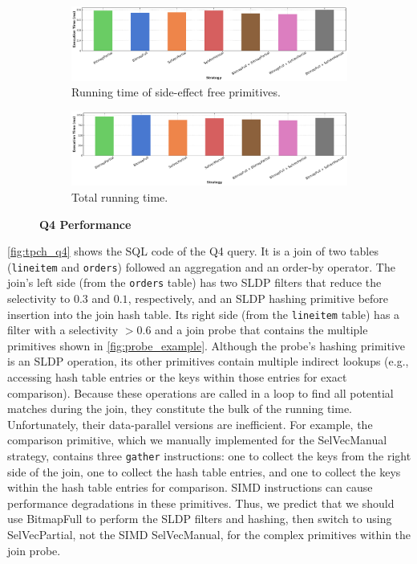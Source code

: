 \documentclass[12pt]{cmuthesis}
\begin{document}
\begin{figure}[t!]
\centering
\hspace*{\fill}%
\begin{subfigure}[t]{.8\linewidth}
 \centering
 \includegraphics[width=0.9\linewidth]{eval/q4_optimized.pdf}
 \caption{Running time of side-effect free primitives.}
  \label{fig:q4_optimized}
\end{subfigure}
\hspace*{\fill}%
\vspace*{8pt}%

\hspace*{\fill}%

\begin{subfigure}[t]{.8\linewidth}
 \centering
 \includegraphics[width=0.9\linewidth]{eval/q4_bench.pdf}
 \caption{Total running time.}
  \label{fig:q4_bench}
\end{subfigure}%
\caption{\textbf{Q4 Performance}}
\label{fig:q4_perf}
\end{figure}

\cref{fig:tpch_q4} shows the SQL code of the Q4 query. It is a join of two tables (\texttt{lineitem} and \texttt{orders}) followed an aggregation and an order-by operator. The join's left side (from the \texttt{orders} table) has two SLDP filters that reduce the selectivity to $0.3$ and $0.1$, respectively, and an SLDP hashing primitive before insertion into the join hash table. Its right side (from the \texttt{lineitem} table) has a filter with a selectivity $>0.6$ and a join probe that contains the multiple primitives shown in \cref{fig:probe_example}. Although the probe's hashing primitive is an SLDP operation, its other primitives contain multiple indirect lookups (e.g., accessing hash table entries or the keys within those entries for exact comparison). Because these operations are called in a loop to find all potential matches during the join, they constitute the bulk of the running time. Unfortunately, their data-parallel versions are inefficient. For example, the comparison primitive, which we manually implemented for the SelVecManual strategy, contains three \texttt{gather} instructions: one to collect the keys from the right side of the join, one to collect the hash table entries, and one to collect the keys within the hash table entries for comparison. SIMD instructions can cause performance degradations in these primitives. Thus, we predict that we should use BitmapFull to perform the SLDP filters and hashing, then switch to using SelVecPartial, not the SIMD SelVecManual, for the complex primitives within the join probe.
\end{document}
